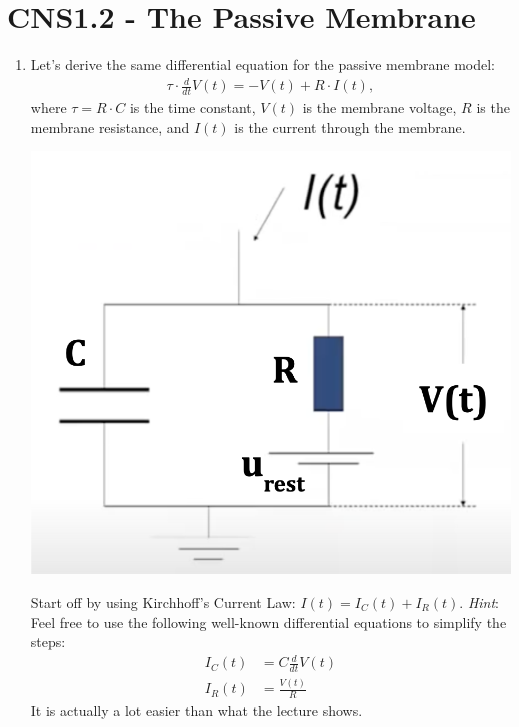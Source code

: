 \documentclass[11pt,letterpaper]{article}
\begin{document}
\section{CNS1.2 - The Passive Membrane}
\begin{enumerate}
    \item Let's derive the same differential equation for the passive membrane model:
    \begin{align*}
        \tau \cdot \frac{d}{dt} V(t) = - V(t) + R \cdot I(t),
    \end{align*}
    where $\tau = R \cdot C$ is the time constant, $V(t)$ is the membrane voltage, $R$ is the membrane resistance, and $I(t)$ is the current through the membrane.
    \begin{center}
        \includegraphics[scale=0.5]{2.1.png}
    \end{center}
    Start off by using Kirchhoff's Current Law: $I(t) = I_C(t) + I_R(t)$. \emph{Hint}: Feel free to use the following well-known differential equations to simplify the steps:
    \begin{align*}
        I_C(t) &= C \frac{d}{dt} V(t)\\
        I_R(t) &= \frac{V(t)}{R}
    \end{align*}
    It is actually a lot easier than what the lecture shows.
    
    
    \pagebreak
    

\end{enumerate}
\end{document}
